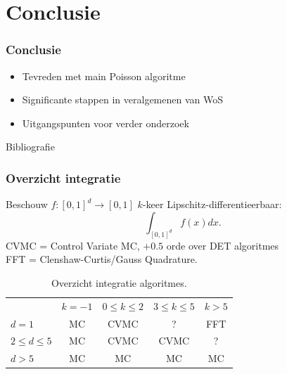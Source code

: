 \documentclass[18pt,aspectratio=149]{beamer}
\begin{document}
\section{Conclusie}

\begin{frame}
    \tableofcontentscurrent
\end{frame}

\begin{frame}
    \frametitle{Conclusie}
    \begin{itemize}
        \item<+->{Tevreden met main Poisson algoritme}
        \item<+->{Significante stappen in veralgemenen van WoS}
        \item<+->{Uitgangspunten voor verder onderzoek}
    \end{itemize}

\end{frame}

\begin{frame}[allowframebreaks]{Bibliografie}
    \nocite{daun_randomized_2011,ermakov_monte_2021,heinrich_optimal_2001}
    \printbibliography
\end{frame}

\begin{frame}
    \frametitle{Overzicht integratie}
    Beschouw $f:[0,1]^d \rightarrow [0,1]$ $k$-keer Lipschitz-differentieerbaar:
    \begin{equation}
        \int_{[0,1]^d} f(x) dx  .
    \end{equation}
    CVMC = Control Variate MC, $+0.5$ orde over DET algoritmes \\
    FFT = Clenshaw-Curtis/Gauss Quadrature.
    \begin{table}
        \centering
        \begin{tabular}{lcccc}
                            & $k=-1$ & $0 \le k \le 2$ & $3 \le k \le 5$ & $k>5$ \\
            $d=1$           & MC     & CVMC            & ?               & FFT   \\
            $2 \le d \le 5$ & MC     & CVMC            & CVMC            & ?     \\
            $d>5$           & MC     & MC              & MC              & MC    \\
        \end{tabular}
        \caption{Overzicht integratie algoritmes.}
    \end{table}
\end{frame}
\end{document}
